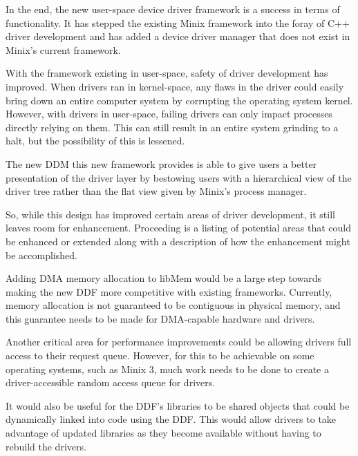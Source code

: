 
In the end, the new user-space device driver framework is a success in
terms of functionality.  It has stepped the existing Minix framework into
the foray of C++ driver development and has added a device driver manager
that does not exist in Minix's current framework.

With the framework existing in user-space, safety of driver development
has improved.  When drivers ran in kernel-space, any flaws in the driver
could easily bring down an entire computer system by corrupting the operating
system kernel.  However, with drivers in user-space, failing drivers can
only impact processes directly relying on them.  This can still result in
an entire system grinding to a halt, but the possibility of this is lessened.

The new DDM this new framework provides is able to give
users a better presentation of the driver layer by bestowing users with a
hierarchical view of the driver tree rather than the flat view given by
Minix's process manager.

So, while this design has improved certain areas of driver development,
it still leaves room for enhancement.  Proceeding is a listing of potential
areas that could be enhanced or extended along with a description of how
the enhancement might be accomplished.


Adding DMA memory allocation to libMem would be a large step towards
making the new DDF more competitive with existing frameworks.  Currently,
memory allocation is not guaranteed to be contiguous in physical memory,
and this guarantee needs to be made for DMA-capable hardware and drivers.

Another critical area for performance improvements could be allowing
drivers full access to their request queue.  However, for this to be
achievable on some operating systems, such as Minix 3, much work needs to be
done to create a driver-accessible random access queue for drivers.


It would also be useful for the DDF's libraries to be shared objects that could
be dynamically linked into code using the DDF.  This would allow drivers to
take advantage of updated libraries as they become available without having
to rebuild the drivers.


